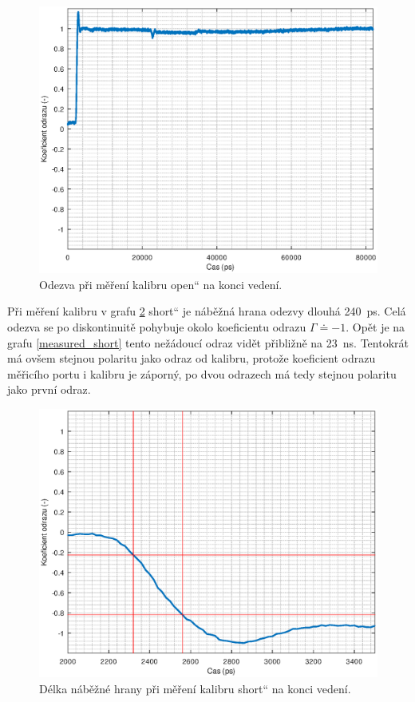 \begin{figure}[htbp]
\includegraphics[width=\textwidth,keepaspectratio]{images/self-measurements/measured_open.eps}\caption{Odezva při měření kalibru \quotedblbase open\textquotedblleft{} na konci vedení.}\label{measured_open}
\end{figure}

Při měření kalibru v grafu \ref{measured_short_risetime} \quotedblbase short\textquotedblleft{} je náběžná hrana odezvy dlouhá \SI{240}{\pico\second}. Celá odezva se po diskontinuitě pohybuje okolo koeficientu odrazu $\Gamma \doteq -1$. Opět je na grafu \ref{measured_short} tento nežádoucí odraz vidět přibližně na \SI{23}{\nano\second}. Tentokrát má ovšem stejnou polaritu jako odraz od kalibru, protože koeficient odrazu měřicího portu i kalibru je záporný, po dvou odrazech má tedy stejnou polaritu jako první odraz.

\begin{figure}[htbp]
\includegraphics[width=\textwidth,keepaspectratio]{images/self-measurements/measure_short_risetime.eps}\caption{Délka náběžné hrany při měření kalibru \quotedblbase short\textquotedblleft{} na konci vedení.}\label{measured_short_risetime}
\end{figure}

